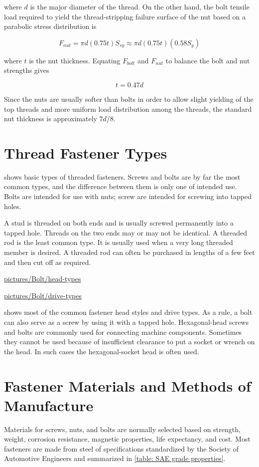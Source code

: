 \documentclass[a4paper,openany,12pt]{book}
\begin{document}
{{where \(d\) is the major diameter of the thread. On the other hand, the
bolt tensile load required to yield the thread-stripping failure surface
of the nut based on a parabolic stress distribution is

$$F_{nut} = \pi d(0.75t)S_{sy} \approx \pi d(0.75t)(0.58S_y)$$

where \(t\) is the nut thickness. Equating \(F_{bolt}\) and \(F_{nut}\) to
balance the bolt and nut strengths gives


$$\label{eqn: required nut thickness}
  t = 0.47d$$

Since the nuts are usually softer than bolts in order to allow slight
yielding of the top threads and more uniform load distribution among the
threads, the standard nut thickness is approximately \(7d/8\).

\section{Thread Fastener Types}
\label{thread-fastener-types}
shows basic types of threaded fasteners. Screws and bolts are by far the
most common types, and the difference between them is only one of
intended use. Bolts are intended for use with nuts; screw are intended
for screwing into tapped holes.


A stud is threaded on both ends and is usually screwed permanently into
a tapped hole. Threads on the two ends may or may not be identical. A
threaded rod is the least common type. It is usually used when a very
long threaded member is desired. A threaded rod can often be purchased
in lengths of a few feet and then cut off as required.


\url{pictures/Bolt/head-types}


\url{pictures/Bolt/drive-types}

shows most of the common fastener head styles and drive types. As a
rule, a bolt can also serve as a screw by using it with a tapped hole.
Hexagonal-head screws and bolts are commonly used for connecting machine
components. Sometimes they cannot be used because of insufficient
clearance to put a socket or wrench on the head. In such cases the
hexagonal-socket head is often used.

\section{Fastener Materials and Methods of Manufacture}
\label{fastener-materials-and-methods-of-manufacture}
Materials for screws, nuts, and bolts are normally selected based on
strength, weight, corrosion resistance, magnetic properties, life
expectancy, and cost. Most fasteners are made from steel of
specifications standardized by the Society of Automotive Engineers and
summarized in \ref{table: SAE grade properties}.

}}
\end{document}
